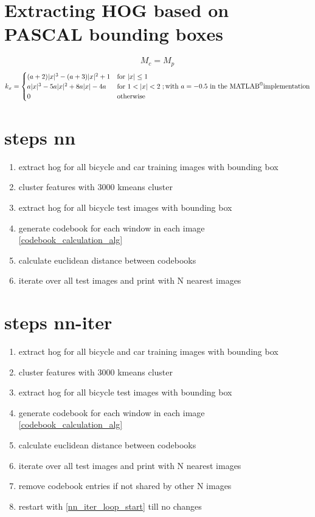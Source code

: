 

\section{Extracting HOG based on PASCAL bounding boxes}
\[
M_c = M_p
\]
\[
k_x = \begin{cases}
	(a+2)|x|^3-(a+3)|x|^2+1 & \text{for } |x| \leq 1 \\
	a|x|^3-5a|x|^2+8a|x|-4a & \text{for } 1 < |x| < 2 \\
	0                       & \text{otherwise}
\end{cases}; \text{with }a=-0.5\text{ in the \MATLAB implementation}
\]

\section{steps nn}
\begin{enumerate}
	\item extract hog for all bicycle and car training images with bounding box
	\item cluster features with 3000 kmeans cluster
	\item extract hog for all bicycle test images with bounding box
	\item generate codebook for each window in each image \ref{codebook_calculation_alg}
	\item calculate euclidean distance between codebooks
	\item iterate over all test images and print with N nearest images
\end{enumerate}
	
\section{steps nn-iter}
\begin{enumerate}
	\item extract hog for all bicycle and car training images with bounding box
	\item cluster features with 3000 kmeans cluster
	\item extract hog for all bicycle test images with bounding box
	\item generate codebook for each window in each image \ref{codebook_calculation_alg}
	\item calculate euclidean distance between codebooks
	\item iterate over all test images and print with N nearest images\label{nn_iter_loop_start}
	\item remove codebook entries if not shared by other N images
	\item restart with \ref{nn_iter_loop_start} till no changes
\end{enumerate}

